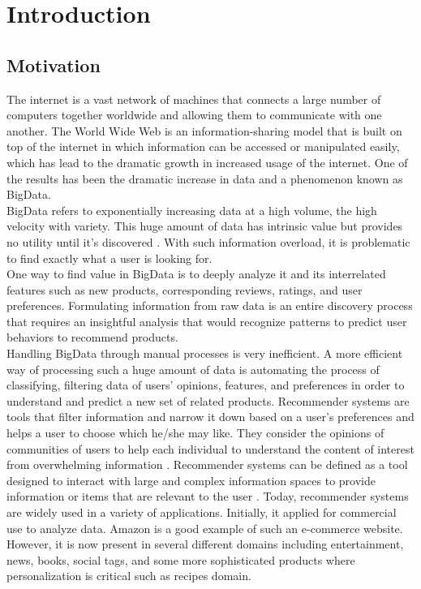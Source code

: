 \chapter{Introduction}
\section{Motivation}
The internet is a vast network of machines that connects a large number of computers together worldwide and allowing them to communicate with one another. The World Wide Web is an information-sharing model that is built on top of the internet in which information can be accessed or manipulated easily, which has lead to the dramatic growth in increased usage of the internet. One of the results has been the dramatic increase in data and a phenomenon known as BigData.
\\
BigData refers to exponentially increasing data at a high volume, the high velocity with variety. This huge amount of data has intrinsic value but provides no utility until it's discovered \cite{2}. With such information overload, it is problematic to find exactly what a user is looking for.
\\
One way to find value in BigData is to deeply analyze it and its interrelated features such as new products, corresponding reviews, ratings, and user preferences. Formulating information from raw data is an entire discovery process that requires an insightful analysis that would recognize patterns to predict user behaviors to recommend products.
\\
Handling BigData through manual processes is very inefficient. A more efficient way of processing such a huge amount of data is automating the process of classifying, filtering data of users' opinions, features, and preferences in order to understand and predict a new set of related products. Recommender systems are tools that filter information and narrow it down based on a user's preferences and helps a user to choose which he/she may like. They consider the opinions of communities of users to help each individual to understand the content of interest from overwhelming information \cite{1}. Recommender systems can be defined as a tool designed to interact with large and complex information spaces to provide information or items that are relevant to the user \cite{4}. Today, recommender systems are widely used in a variety of applications. Initially, it applied for commercial use to analyze data. Amazon is a good example of such an e-commerce website. However, it is now present in several different domains including entertainment, news, books, social tags, and some more sophisticated products where personalization is critical such as recipes domain.
